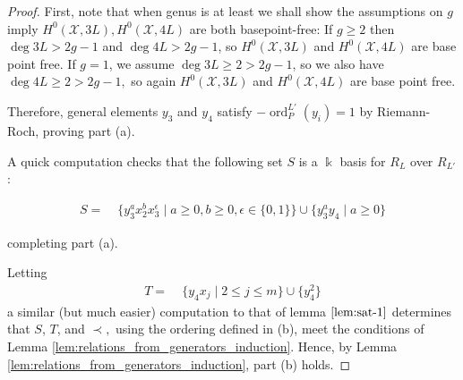 \documentclass{amsart}
\theoremstyle{plain}
\theoremstyle{definition}
\theoremstyle{remark}
\numberwithin{equation}{section}
\newcommand\Bk{{\Bbbk}}
\DeclareMathOperator{\ord}{ord}
\newcommand\sx{\mathscr X}
\newcommand{\halfcan}{L}
\begin{document}
\begin{proof}
First, note that when genus is at least we shall show the assumptions on $g$ imply $H^0(\sx, 3 \halfcan), H^0(\sx, 4 \halfcan)$ are both basepoint-free: If $g \geq 2$ then $\deg 3 \halfcan > 2g - 1$ 
and $\deg 4 \halfcan > 2g - 1$, so $H^0(\sx, 3 \halfcan)$ and $H^0(\sx, 4 \halfcan)$ are base point free. If $g = 1$, we assume $\deg 3 \halfcan \geq 2 > 2g - 1$, so we also have $\deg 4 \halfcan \geq 2 > 2g - 1,$ so again $H^0(\sx, 3 \halfcan)$ and $H^0(\sx, 4 \halfcan)$ are base point free. 

Therefore, general elements $y_3$ and $y_4$ satisfy $-\ord_P^{\halfcan'}(y_i) = 1$ by Riemann-Roch, proving part (a).

A quick computation checks that
the following set $S$ is a $\Bk$ basis for $R_\halfcan$ over $R_{\halfcan'}$:

\begin{align*}
	S =	& \; \{ y_3^ax_2^b x_3^\epsilon \mid a \geq 0, b 
	\geq 0, \epsilon \in \{0, 1\}\} \cup \{ y_3^ay_4 \mid a \geq 0 \}
\end{align*}

\noindent
completing part (a).

Letting
\begin{align*}
	T =   &\; \{ y_4 x_j \mid 2 \leq j \leq m \}\cup \{ y_4^2 \}
\end{align*}
a similar (but much easier) computation to that of lemma $\ref{lem:sat-1}$ determines that $S$, $T$, and $\prec,$ using the ordering defined in (b), meet the conditions of 
Lemma \ref{lem:relations_from_generators_induction}. 
Hence, by Lemma \ref{lem:relations_from_generators_induction}, part (b) holds.
\end{proof}
\end{document}
